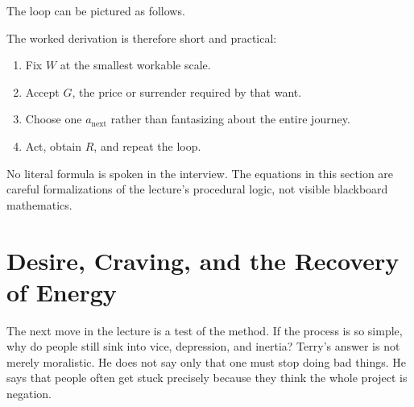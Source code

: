 The loop can be pictured as follows.

\begin{figure}[h]
\centering
{}
\end{figure}

The worked derivation is therefore short and practical:
\begin{enumerate}
\item Fix \(W\) at the smallest workable scale.
\item Accept \(G\), the price or surrender required by that want.
\item Choose one \(a_{\text{next}}\) rather than fantasizing about the entire journey.
\item Act, obtain \(R\), and repeat the loop.
\end{enumerate}

\begin{remark}
No literal formula is spoken in the interview. The equations in this section are careful formalizations of the lecture's procedural logic, not visible blackboard mathematics.
\end{remark}

\section{Desire, Craving, and the Recovery of Energy}

The next move in the lecture is a test of the method. If the process is so simple, why do people still sink into vice, depression, and inertia? Terry's answer is not merely moralistic. He does not say only that one must stop doing bad things. He says that people often get stuck precisely because they think the whole project is negation.

